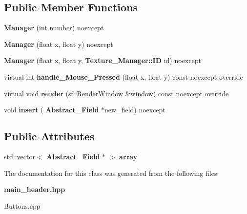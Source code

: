 \subsection*{Public Member Functions}
\begin{DoxyCompactItemize}
\item 
\mbox{\label{class_manager_a96cd1ec402e2c7eae1bcfba02e2b98b6}} 
{\bfseries Manager} (int number) noexcept
\item 
\mbox{\label{class_manager_a50645ccfb34fbf2ca5a2cb2d71b6a4cf}} 
{\bfseries Manager} (float x, float y) noexcept
\item 
\mbox{\label{class_manager_afa63bf1660484bb7e0f59e8442463233}} 
{\bfseries Manager} (float x, float y, \textbf{ Texture\+\_\+\+Manager\+::\+ID} id) noexcept
\item 
\mbox{\label{class_manager_a7b8a0c6a669ac52cba99504a55fee9ee}} 
virtual int {\bfseries handle\+\_\+\+Mouse\+\_\+\+Pressed} (float x, float y) const noexcept override
\item 
\mbox{\label{class_manager_a6831593059b3466ef04dbaf49fc86a26}} 
virtual void {\bfseries render} (sf\+::\+Render\+Window \&window) const noexcept override
\item 
\mbox{\label{class_manager_a02ef98b2d31dd2a0dc9904f851683e4b}} 
void {\bfseries insert} (\textbf{ Abstract\+\_\+\+Field} $\ast$new\+\_\+field) noexcept
\end{DoxyCompactItemize}
\subsection*{Public Attributes}
\begin{DoxyCompactItemize}
\item 
\mbox{\label{class_manager_a68fec7e7b354db503dd062da7bc03b34}} 
std\+::vector$<$ \textbf{ Abstract\+\_\+\+Field} $\ast$ $>$ {\bfseries array}
\end{DoxyCompactItemize}


The documentation for this class was generated from the following files\+:\begin{DoxyCompactItemize}
\item 
\textbf{ main\+\_\+header.\+hpp}\item 
Buttons.\+cpp\end{DoxyCompactItemize}
